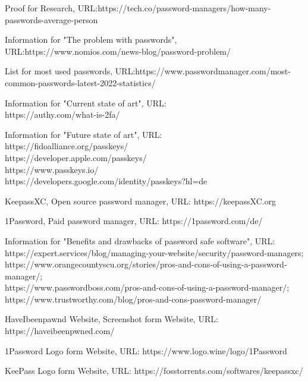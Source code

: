 \documentclass[conference]{IEEEtran}
\begin{document}
\begin{thebibliography}{00}
 Proof for Research, URL:https://tech.co/password-managers/how-many-passwords-average-person

 Information for "The problem with passwords", URL:https://www.nomios.com/news-blog/password-problem/ 

 List for most used passwords, URL:https://www.passwordmanager.com/most-common-passwords-latest-2022-statistics/

 Information for "Current state of art", URL:\\ https://authy.com/what-is-2fa/

 Information for "Future state of art", URL:\\https://fidoalliance.org/passkeys/\\ https://developer.apple.com/passkeys/\\ https://www.passkeys.io/\\ https://developers.google.com/identity/passkeys?hl=de

 KeepassXC, Open source password manager, URL: https://keepassXC.org

 1Password, Paid password manager, URL: https://1password.com/de/

 Information for "Benefits and drawbacks of password safe software", URL: \\
https://expert.services/blog/managing-your-website/security/password-managers;\\ https://www.orangecountyscu.org/stories/pros-and-cons-of-using-a-password-manager/; \\ https://www.passwordboss.com/pros-and-cons-of-using-a-password-manager/; \\https://www.trustworthy.com/blog/pros-and-cons-password-manager/

 HaveIbeenpawnd Website, Screenshot form Website, URL: https://haveibeenpwned.com/

 1Password Logo form Website, URL: https://www.logo.wine/logo/1Password

 KeePass Logo form Website, URL: https://fosstorrents.com/softwares/keepassxc/

\end{thebibliography}
\end{document}
